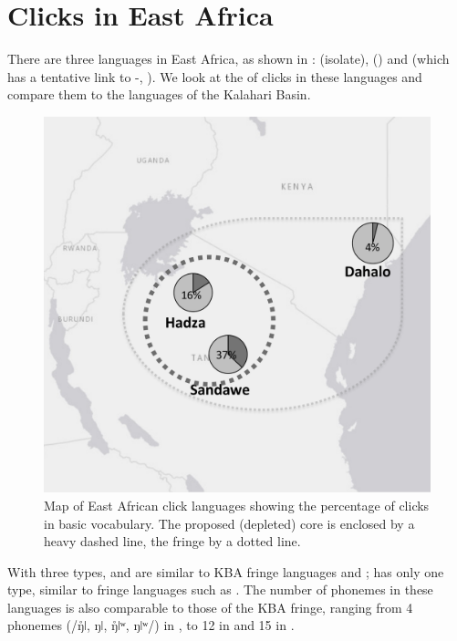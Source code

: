 \documentclass[output=paper
,newtxmath
,modfonts
,nonflat]{langsci/langscibook}
\begin{document}
\section{Clicks in East Africa}\label{sec:sands:6}

There are three  languages in East Africa, as shown in :  (isolate),  () and  (which has a tentative link to -, \citealt{Güldemann2010}). We look at the  of clicks in these languages and compare them to the languages of the Kalahari Basin. 


\begin{figure}
\includegraphics[width=\textwidth]{figures/sands-fig6.png}
\caption{Map of East African click languages showing the percentage of clicks in basic vocabulary. The proposed (depleted) core is enclosed by a heavy dashed line, the fringe by a dotted line.}
\label{fig:sands:6}
\end{figure}

With three  types,  and  are similar to KBA fringe languages  and ;  has only one  type, similar to fringe languages such as . The number of  phonemes in these languages is also comparable to those of the KBA fringe, ranging from 4 phonemes (/ŋ̊ǀ, ŋǀ, ŋ̊ǀʷ, ŋǀʷ/) in  \citep{Maddieson1993}, to 12 in  \citep{Miller2012} and 15 in  \citep{Elderkin2013,hunziker2008}. 
\end{document}
